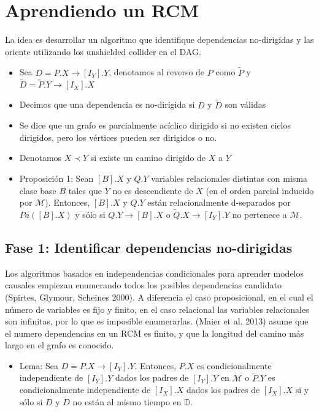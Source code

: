 \documentclass[11pt]{article}
\theoremstyle{plain}
\begin{document}
\section{Aprendiendo un RCM}
La idea es desarrollar un algoritmo que identifique dependencias no-dirigidas y las oriente utilizando los unshielded collider en el DAG. 
\begin{itemize}
\item Sea $D = P.X \to [I_Y].Y$, denotamos al reverso de $P$ como $\tilde{P}$ y $\tilde{D}= \tilde{P}.Y \to [I_X].X$
\item Decimos que una dependencia es no-dirigida si $D$ y $\tilde{D}$ son válidas
\item Se dice que un grafo es parcialmente acíclico dirigido si no existen ciclos dirigidos, pero los vértices pueden ser dirigidos o no.
\item Denotamos $X \prec Y$ si existe un camino dirigido de $X$ a $Y$
\item Proposición 1: Sean $[B].X$ y $Q.Y$ variables relacionales distintas con misma clase base $B$ tales que $Y$ no es descendiente de $X$ (en el orden parcial inducido por $\mathcal{M}$). Entonces, $[B].X$ y $Q.Y$ están relacionalmente d-separados por $Pa([B].X)$ y sólo si $Q.Y \to [B].X$ o $\tilde{Q}.X \to [I_Y].Y$ no pertenece a $\mathcal{M}$. 
\end{itemize}
\subsection{Fase 1: Identificar dependencias no-dirigidas}
Los algoritmos basados en independencias condicionales para aprender modelos causales empiezan enumerando todos los posibles dependencias candidato (Spirtes, Glymour, Scheines 2000). A diferencia el caso proposicional, en el cual el número de variables es fijo y finito, en el caso relacional las variables relacionales son infinitas, por lo que es imposible enumerarlas. (Maier et al. 2013) asume que el numero dependencias en un RCM es finito, y que la longitud del camino más largo en el grafo es conocido.
\begin{itemize}
\item Lema: Sea $D = P.X \to [I_Y].Y$. Entonces, $P.X$ es condicionalmente independiente de $[I_Y].Y$ dados los padres de $[I_Y].Y$ en $\mathcal{M}$ o $\tilde{P}.Y$ es condicionalmente independiente de $[I_X].X$ dados los padres de $[I_X].X$ si y sólo si $D$ y $\tilde{D}$ no están al mismo tiempo en $\mathbb{D}$.
\end{itemize}
\end{document}

